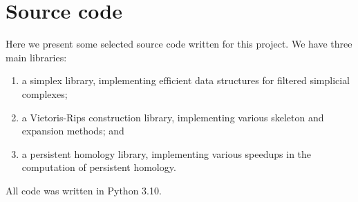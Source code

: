 \chapter{Source code}
\label{app:source-code}

Here we present some selected source code written for this project. We have three main libraries:
\begin{enumerate}
    \item a simplex library, implementing efficient data structures for filtered simplicial complexes; 
    \item a Vietoris-Rips construction library, implementing various skeleton and expansion methods; and
    \item a persistent homology library, implementing various speedups in the computation of persistent homology. 
\end{enumerate}
All code was written in Python 3.10.




